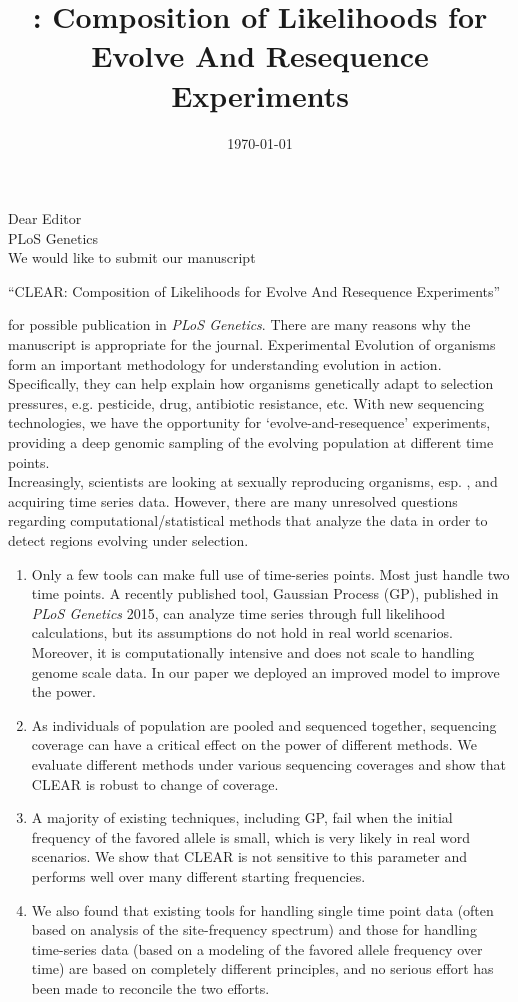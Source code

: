 \documentclass[11pt]{article}
\title{\comale: Composition of Likelihoods for Evolve And Resequence 
Experiments}
\date{\today}
\begin{document}
\noindent Dear Editor\\
\noindent PLoS Genetics\\

\noindent We would like to submit our manuscript  

``CLEAR: Composition of Likelihoods for Evolve And Resequence Experiments''

\noindent for possible publication in \emph{PLoS Genetics}. There are many 
reasons why 
the 
manuscript is appropriate for the journal. Experimental Evolution of organisms 
form an important methodology for understanding evolution in action. 
Specifically, they can help explain how organisms genetically adapt to 
selection pressures, e.g. pesticide, drug, antibiotic resistance, etc. With new 
sequencing technologies, we have the opportunity for ‘evolve-and-resequence’ 
experiments, providing a deep genomic sampling of the evolving population at 
different time points. \\

Increasingly, scientists are looking at sexually reproducing organisms, esp. 
\dmel, and acquiring time series data. However, there are many unresolved 
questions regarding computational/statistical methods that analyze the data in 
order to detect regions evolving under selection.
\begin{enumerate}
	\item Only a few tools can make full use of time-series points. Most just 
	handle 
	two time points. A recently published tool, Gaussian Process (GP), 
	published in 
	\emph{PLoS Genetics} 2015, can analyze time series through full likelihood 
	calculations, but its assumptions do not hold in real world scenarios. 
	Moreover, it is computationally intensive and does not scale to handling 
	genome 
	scale data. In our paper we deployed an improved model to improve the power.
	\item As individuals of population are pooled and sequenced together, 
	sequencing 
	coverage can have a critical effect on the power of different methods. We 
	evaluate different methods under various sequencing coverages and show that 
	CLEAR is robust to change of coverage.
	\item A majority of existing techniques, including GP, fail when the 
	initial 
	frequency of the favored allele is small, which is very likely in real word 
	scenarios. We show that CLEAR is not sensitive to this parameter and 
	performs 
	well over many different starting frequencies.
	\item We also found that existing tools for handling single time point data 
	(often 
	based on analysis of the site-frequency spectrum) and those for handling 
	time-series data (based on a modeling of the favored allele frequency over 
	time) are based on completely different principles, and no serious effort 
	has 
	been made to reconcile the two efforts.
\end{enumerate}
\end{document}
